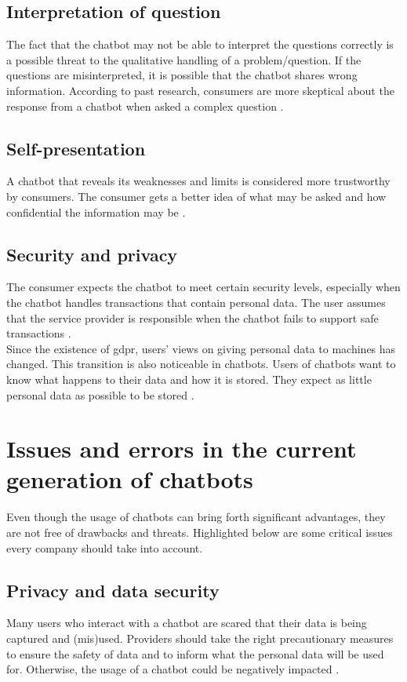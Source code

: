 \subsection{Interpretation of question}
The fact that the chatbot may not be able to interpret the questions correctly is a possible threat to the qualitative handling of a problem/question. If the questions are misinterpreted, it is possible that the chatbot shares wrong information. According to past research, consumers are more skeptical about the response from a chatbot when asked a complex question \citep*{Folstad2018,Nordheim2019}.

\subsection{Self-presentation}
A chatbot that reveals its weaknesses and limits is considered more trustworthy by consumers. The consumer gets a better idea of what may be asked and how confidential the information may be \citep{Folstad2018}.

\subsection{Security and privacy}
The consumer expects the chatbot to meet certain security levels, especially when the chatbot handles transactions that contain personal data. The user assumes that the service provider is responsible when the chatbot fails to support safe transactions \citep*{Folstad2018, Nordheim2019}.\\
Since the existence of \acrfull{gdpr}, users' views on giving personal data to machines has changed. This transition is also noticeable in chatbots. Users of chatbots want to know what happens to their data and how it is stored. They expect as little personal data as possible to be stored \citep*{Folstad2018, Nordheim2019}. 

\section{Issues and errors in the current generation of chatbots}
Even though the usage of chatbots can bring forth significant advantages, they are not free of drawbacks and threats. Highlighted below are some critical issues every company should take into account.

\subsection{Privacy and data security}
Many users who interact with a chatbot are scared that their data is being captured and (mis)used. Providers should take the right precautionary measures to ensure the safety of data and to inform what the personal data will be used for. Otherwise, the usage of a chatbot could be negatively impacted \citep*{Adamopoulou2020, Duka2021, Rese2020}.


